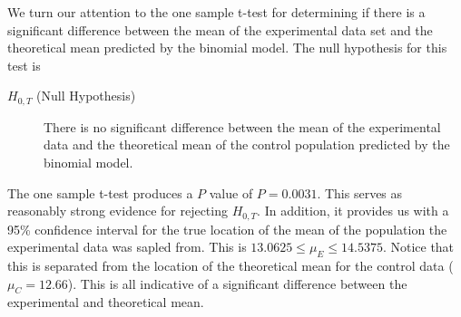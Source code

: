 \documentclass{amsart}
\begin{document}
We turn our attention to the one sample t-test for determining if there is a significant difference between the mean of the experimental data set and the theoretical mean predicted by the binomial model. The null hypothesis for this test is
\begin{description}
\item[$H_{0,T}$ (Null Hypothesis)] There is no significant difference between the mean of the experimental data and the theoretical mean of the control population predicted by the binomial model.
\end{description}
The one sample t-test produces a $P$ value of $P=0.0031$. This serves as reasonably strong evidence for rejecting $H_{0,T}$. In addition, it provides us with a 95\% confidence interval for the true location of the mean of the population the experimental data was sapled from. This is $13.0625 \le \mu_E \le 14.5375$. Notice that this is separated from the location of the theoretical mean for the control data ($\mu_C=12.66$). This is all indicative of a significant difference between the experimental and theoretical mean.
\end{document}
